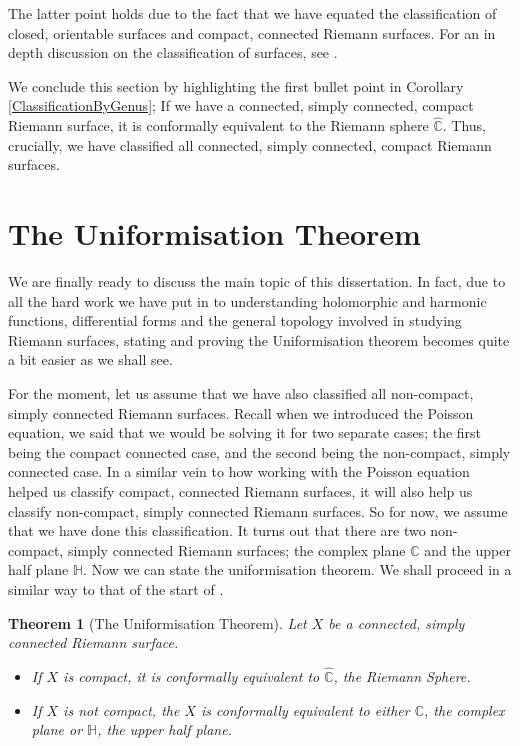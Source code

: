 \documentclass[11pt]{report}
\newtheorem{thm}{Theorem}[section]
\theoremstyle{definition}
\begin{document}
The latter point holds due to the fact that we have equated the classification of closed, orientable surfaces and compact, connected Riemann surfaces. For an in depth discussion on the classification of surfaces, see \cite{maunder}.

We conclude this section by highlighting the first bullet point in Corollary \ref{ClassificationByGenus}; If we have a connected, simply connected, compact Riemann surface, it is conformally equivalent to the Riemann sphere $\hat{\mathbb{C}}$. Thus, crucially, we have classified all connected, simply connected, compact Riemann surfaces.

\section{The Uniformisation Theorem}
We are finally ready to discuss the main topic of this dissertation. In fact, due to all the hard work we have put in to understanding holomorphic and harmonic functions, differential forms and the general topology involved in studying Riemann surfaces, stating and proving the Uniformisation theorem becomes quite a bit easier as we shall see. 

For the moment, let us assume that we have also classified all non-compact, simply connected Riemann surfaces. Recall when we introduced the Poisson equation, we said that we would be solving it for two separate cases; the first being the compact connected case, and the second being the non-compact, simply connected case. In a similar vein to how working with the Poisson equation helped us classify compact, connected Riemann surfaces, it will also help us classify non-compact, simply connected Riemann surfaces. So for now, we assume that we have done this classification. It turns out that there are two non-compact, simply connected Riemann surfaces; the complex plane $\mathbb{C}$ and the upper half plane $\mathbb{H}$.
Now we can state the uniformisation theorem. We shall proceed in a similar way to that of the start of \cite[(Chapter 10)]{donaldson}.

\begin{thm}[The Uniformisation Theorem]\label{Uniformisation}
  Let $X$ be a connected, simply connected Riemann surface. 
  \begin{itemize}
    \item If $X$ is compact, it is conformally equivalent to $\hat{\mathbb{C}}$, the Riemann Sphere. 
    \item If $X$ is not compact, the $X$ is conformally equivalent to either $\mathbb{C}$, the complex plane or $\mathbb{H}$, the upper half plane.
  \end{itemize}
\end{thm}
\end{document}
